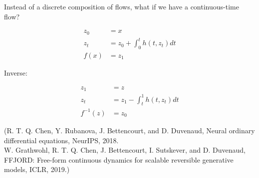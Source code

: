 \begin{definition}[10.34][FFJORD]
    Instead of a discrete composition of flows, what if we have a continuous-time flow?

    $$
    \begin{aligned}
    z_{0} & =x \\
    z_{t} & =z_{0}+\int_{0}^{t} h\left(t, z_{t}\right) d t \\
    f(x) & =z_{1}
    \end{aligned}
    $$

    Inverse:

    $$
    \begin{aligned}
    z_{1} & =z \\
    z_{t} & =z_{1}-\int_{t}^{1} h\left(t, z_{t}\right) d t \\
    f^{-1}(z) & =z_{0}
    \end{aligned}
    $$

    (R. T. Q. Chen, Y. Rubanova, J. Bettencourt, and D. Duvenaud, Neural ordinary differential equations, NeurIPS, 2018.\\
    W. Grathwohl, R. T. Q. Chen, J. Bettencourt, I. Sutskever, and D. Duvenaud, FFJORD: Free-form continuous dynamics for scalable reversible generative models, ICLR, 2019.)
\end{definition}
